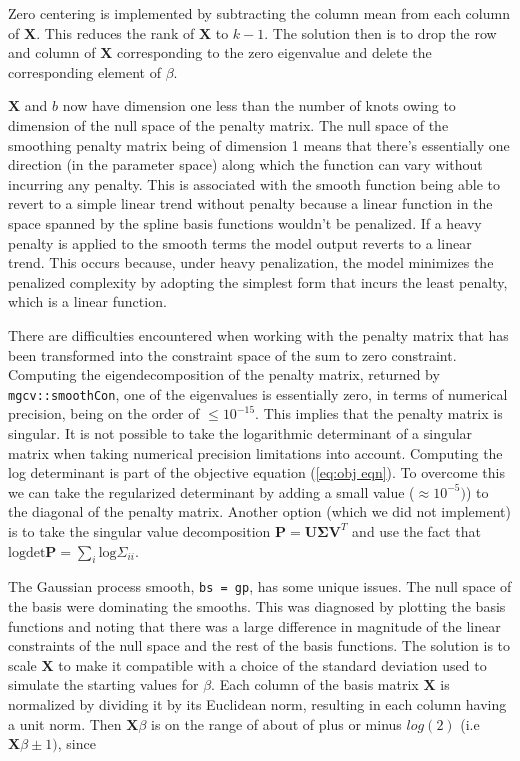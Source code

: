 \documentclass[
11pt, %
oneside, %
english, %
singlespacing, %
]{macthesis} %
\begin{document}
Zero centering is implemented by subtracting the column mean from each column of \(\mathbf{X}\). This reduces the rank of \(\mathbf{X}\) to \(k-1\). The solution then is to drop the row and column of \(\mathbf{X}\) corresponding to the zero eigenvalue and delete the corresponding element of \(\beta\).

\(\mathbf{X}\) and \(b\) now have dimension one less than the number of knots owing to dimension of the null space of the penalty matrix. The null space of the smoothing penalty matrix being of dimension 1 means that there's essentially one direction (in the parameter space) along which the function can vary without incurring any penalty. This is associated with the smooth function being able to revert to a simple linear trend without penalty because a linear function in the space spanned by the spline basis functions wouldn't be penalized. If a heavy penalty is applied to the smooth terms the model output reverts to a linear trend. This occurs because, under heavy penalization, the model minimizes the penalized complexity by adopting the simplest form that incurs the least penalty, which is a linear function.

There are difficulties encountered when working with the penalty matrix that has been transformed into the constraint space of the sum to zero constraint. Computing the eigendecomposition of the penalty matrix, returned by \texttt{mgcv::smoothCon}, one of the eigenvalues is essentially zero, in terms of numerical precision, being on the order of \(\leq 10^{-15}\). This implies that the penalty matrix is singular. It is not possible to take the logarithmic determinant of a singular matrix when taking numerical precision limitations into account. Computing the log determinant is part of the objective equation (\ref{eq:obj eqn}). To overcome this we can take the regularized determinant by adding a small value (\(\approx 10^{-5})\)) to the diagonal of the penalty matrix. Another option (which we did not implement) is to take the singular value decomposition \(\mathbf{P} = \mathbf{U}\mathbf{\Sigma} \mathbf{V}^T\) and use the fact that \(\text{logdet}\mathbf{P}= \sum_i \text{log}\Sigma_{ii}\).

The Gaussian process smooth, \texttt{bs\ =\ gp}, has some unique issues. The null space of the basis were dominating the smooths. This was diagnosed by plotting the basis functions and noting that there was a large difference in magnitude of the linear constraints of the null space and the rest of the basis functions.
The solution is to scale \(\mathbf{X}\) to make it compatible with a choice of the standard deviation used to simulate the starting values for \(\beta\). Each column of the basis matrix \(\mathbf{X}\) is normalized by dividing it by its Euclidean norm, resulting in each column having a unit norm. Then \(\mathbf{X}\beta\) is on the range of about of plus or minus \(log(2)\) (i.e \(\mathbf{X}\beta \pm 1)\), since
\end{document}
